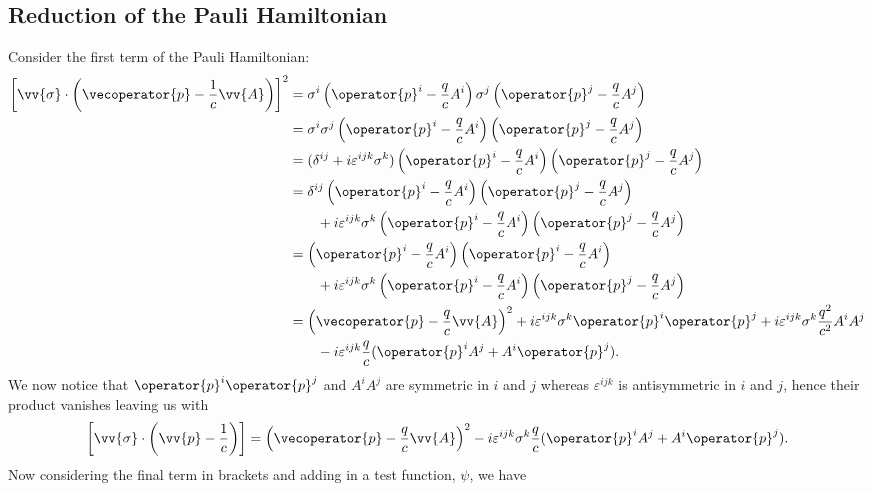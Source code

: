 \documentclass[fleqn]{NotesClass}
\begin{document}
    \subsection{Reduction of the Pauli Hamiltonian}
    Consider the first term of the Pauli Hamiltonian:
    \begin{align}
        \left[ \vv{\sigma} \cdot \left( \vecoperator{p} - \frac{1}{c}\vv{A} \right) \right]^2 &= \sigma^i\left( \operator{p}^i - \frac{q}{c}A^i \right) \sigma^j\left( \operator{p}^j - \frac{q}{c}A^j \right)\\
        &= \sigma^i\sigma^j\left( \operator{p}^i - \frac{q}{c}A^i \right)\left( \operator{p}^j - \frac{q}{c}A^j \right)\\
        &= (\delta^{ij} + i\varepsilon^{ijk}\sigma^k)\left( \operator{p}^i - \frac{q}{c}A^i \right)\left( \operator{p}^j - \frac{q}{c}A^j \right)\\
        &= \delta^{ij}\left( \operator{p}^i - \frac{q}{c}A^i \right)\left( \operator{p}^j - \frac{q}{c}A^j \right)\notag\\
        &\qquad+ i\varepsilon^{ijk}\sigma^k\left( \operator{p}^i - \frac{q}{c}A^i \right)\left( \operator{p}^j - \frac{q}{c}A^j \right)\\
        &= \left( \operator{p}^i - \frac{q}{c}A^i \right)\left( \operator{p}^i - \frac{q}{c}A^i \right)\notag\\
        &\qquad+ i\varepsilon^{ijk}\sigma^k\left( \operator{p}^i - \frac{q}{c}A^i \right)\left( \operator{p}^j - \frac{q}{c}A^j \right)\notag\\
        &= \left( \vecoperator{p} - \frac{q}{c}\vv{A} \right)^2 + i\varepsilon^{ijk}\sigma^k\operator{p}^i\operator{p}^j + i\varepsilon^{ijk}\sigma^k\frac{q^2}{c^2}A^iA^j\notag\\
        &\qquad- i\varepsilon^{ijk}\frac{q}{c}(\operator{p}^iA^j + A^i\operator{p}^j).
    \end{align}
    We now notice that \(\operator{p}^i\operator{p}^j\) and \(A^iA^j\) are symmetric in \(i\) and \(j\) whereas \(\varepsilon^{ijk}\) is antisymmetric in \(i\) and \(j\), hence their product vanishes leaving us with
    \begin{equation}
        \left[ \vv{\sigma} \cdot \left( \vv{p} - \frac{1}{c} \right) \right] = \left( \vecoperator{p} - \frac{q}{c}\vv{A} \right)^2 - i\varepsilon^{ijk}\sigma^k\frac{q}{c}(\operator{p}^iA^j + A^i\operator{p}^j).
    \end{equation}
    Now considering the final term in brackets and adding in a test function, \(\psi\), we have
\end{document}
